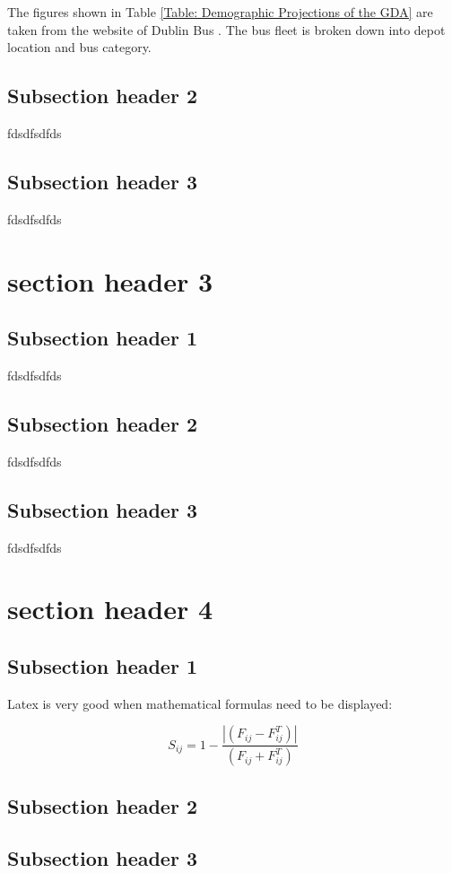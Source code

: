 The figures shown in Table \ref{Table: Demographic Projections of the GDA} are taken from the
website of Dublin Bus \citep{DUB05}. The bus fleet is broken down into depot location and bus
category.

\subsection{Subsection header 2}
fdsdfsdfds
\subsection{Subsection header 3}
fdsdfsdfds

\section{section header 3}

\subsection{Subsection header 1}
fdsdfsdfds
\subsection{Subsection header 2}
fdsdfsdfds
\subsection{Subsection header 3}
fdsdfsdfds

\section{section header 4}

\subsection{Subsection header 1}

Latex is very good when mathematical formulas need to be displayed:

\begin{equation}\label{taeq2}
    S_{ij}=1-{\frac{|(F_{ij}-F^T_{ij})|}{(F_{ij}+F^T_{ij})}}
\end{equation}


\subsection{Subsection header 2}
\subsection{Subsection header 3}
